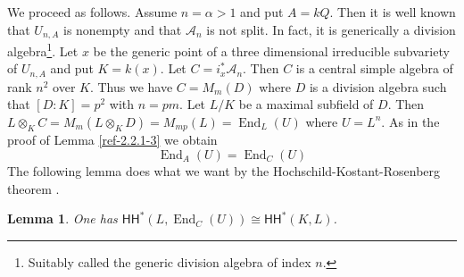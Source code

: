 \documentclass{amsart}
\numberwithin{equation}{section}
\let\cal\mathcal
\newtheorem{lemma}{Lemma}[section]
\theoremstyle{definition}
\theoremstyle{remark}
\begin{document}
We proceed as follows. Assume $n=\alpha>1$ and put $A=kQ$. Then it is well known \cite{Procesi2} that $U_{n,A}$ is nonempty
and that ${{\cal A}}_n$ is not split. In fact, it is generically a division algebra\footnote{Suitably called
the generic division algebra of index $n$.}. Let $x$ be the generic point of
a three dimensional irreducible subvariety of $U_{n,A}$ and put $K=k(x)$. Let $C=i^\ast_x{{\cal A}}_n$. Then
$C$ is a central simple algebra of rank $n^2$ over $K$. Thus we have $C=M_m(D)$ 
 where $D$ is a division algebra such that $[D:K]=p^2$ with $n=pm$. Let $L/K$ be a maximal subfield
of $D$. Then $L\otimes_K C=M_m(L\otimes_K D)=M_{mp}(L)={\operatorname {End}}_L(U)$ where $U=L^{n}$.  As in the proof of
Lemma \ref{ref-2.2.1-3} we obtain 
\[
{\operatorname {End}}_A(U)={\operatorname {End}}_C(U)
\]
The following lemma
does what we want by the Hochschild-Kostant-Rosenberg theorem \cite{HKR}. 
\begin{lemma} One has
$
{\mathsf{HH}}^\ast(L,{\operatorname {End}}_C(U))\cong {\mathsf{HH}}^\ast(K,L)
$.
\end{lemma}
\end{document}

